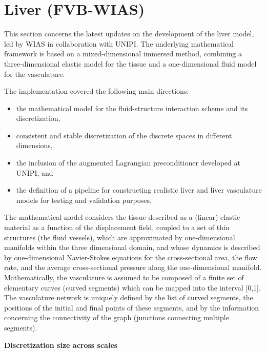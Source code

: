 \documentclass[a4paper,12pt]{article}
\begin{document}
\section{Liver (FVB-WIAS)}    \label{sec:wias}


This section concerns the latest updates on the development of the liver model, led by WIAS in collaboration with UNIPI. The underlying mathematical framework is based on a mixed-dimensional immersed method, combining a three-dimensional elastic model for the tissue and a one-dimensional fluid model for the vasculature.

The implementation covered the following main directions:
\begin{itemize}[left=1.5em, itemsep=0pt, topsep=0pt]
\item the mathematical model for the fluid-structure interaction scheme and its discretization,
\item consistent and stable discretization of the discrete spaces in different dimensions,
\item the inclusion of the augmented Lagrangian preconditioner developed at UNIPI, and
\item the definition of a pipeline for constructing realistic liver and liver vasculature models for testing and validation purposes.

\end{itemize}
The mathematical model considers the tissue described as a (linear) elastic material as a function of the displacement field, coupled to a set of thin structures (the fluid vessels), which are approximated by one-dimensional manifolds within the three dimensional domain, and whose dynamics is described by one-dimensional Navier-Stokes equations for the cross-sectional area, the flow rate, and the average cross-sectional pressure along the one-dimensional manifold. Mathematically, the vasculature is assumed to be composed of a finite set of elementary curves (curved segments) which can be mapped into the interval [0,1]. The vasculature network is uniquely defined by the list of curved segments, the positions of the initial and final points of these segments, and by the information concerning the connectivity of the graph (junctions connecting multiple segments).

\noindent\textbf{Discretization size across scales }
\end{document}
